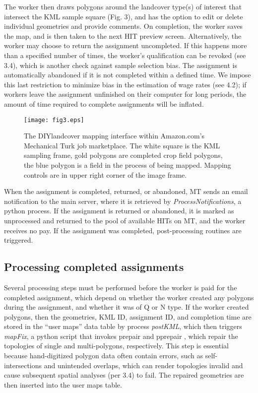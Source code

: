 \documentclass[preprint,12pt,authoryear]{elsarticle}
\begin{document}
The worker then draws polygons around the landcover type(s) of interest that intersect the KML sample square (Fig. 3), and has the option to edit or delete individual geometries and provide comments. On completion, the worker saves the map, and is then taken to the next HIT preview screen. Alternatively, the worker may choose to return the assignment uncompleted. If this happens more than a specified number of times, the worker's qualification can be revoked (see 3.4), which is another check against sample selection bias.  The assignment is automatically abandoned if it is not completed within a defined time. We impose this last restriction to minimize bias in the estimation of wage rates (see 4.2); if workers leave the assignment unfinished on their computer for long periods, the amount of time required to complete assignments will be inflated.

\begin{figure}[!ht]
  \begin{center}
    \texttt{[image: fig3.eps]}
    \caption{The DIYlandcover mapping interface within Amazon.com's Mechanical Turk job marketplace. The white square is the KML sampling frame, gold polygons are completed crop field polygons, the blue polygon is a field in the process of being mapped. Mapping controls are in upper right corner of the image frame.}
    \label{default}
  \end{center}
\end{figure}

When the assignment is completed, returned, or abandoned, MT sends an email notification to the main server, where it is retrieved by \emph{ProcessNotifications}, a python process. If the assignment is returned or abandoned, it is marked as unprocessed and returned to the pool of available HITs on MT, and the worker receives no pay. If the assignment was completed, post-processing routines are triggered. 

\subsection{Processing completed assignments}
Several processing steps must be performed before the worker is paid for the completed assignment, which depend on whether the worker created any polygons during the assignment, and whether it was of Q or N type. If the worker created polygons, then the geometries, KML ID, assignment ID, and completion time are stored in the ``user maps'' data table by process \emph{postKML}, which then triggers \emph{mapFix}, a python script that invokes prepair and pprepair \citep{ohori_validation_2012}, which repair the topologies of single and multi-polygons, respectively. This step is essential because hand-digitized polygon data often contain errors, such as self-intersections and unintended overlaps, which can render topologies invalid and cause subsequent spatial analyses (per 3.4) to fail.  The repaired geometries are then inserted into the user maps table.  
\end{document}
